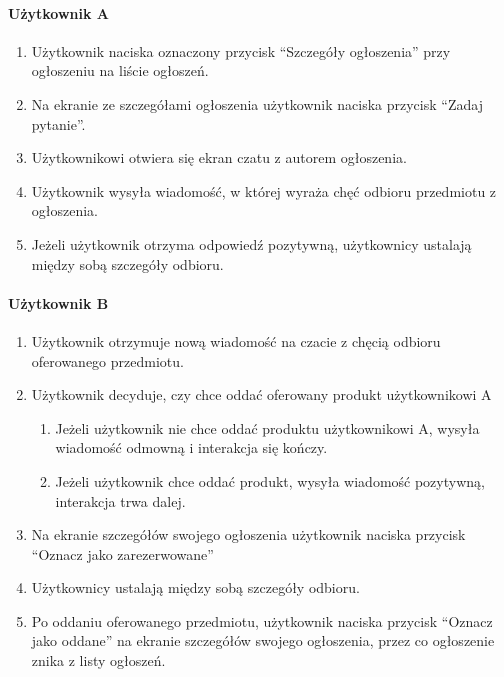 \documentclass[12pt,a4paper,twoside]{article}
\begin{document}
    \paragraph{Użytkownik A}

    \begin{enumerate}
        \item Użytkownik naciska oznaczony przycisk ``Szczegóły ogłoszenia'' przy ogłoszeniu na liście ogłoszeń.
        \item Na ekranie ze szczegółami ogłoszenia użytkownik naciska przycisk ``Zadaj pytanie''.
        \item Użytkownikowi otwiera się ekran czatu z autorem ogłoszenia.
        \item Użytkownik wysyła wiadomość, w której wyraża chęć odbioru przedmiotu z ogłoszenia.
        \item Jeżeli użytkownik otrzyma odpowiedź pozytywną, użytkownicy ustalają między sobą szczegóły odbioru.
    \end{enumerate}

    \paragraph{Użytkownik B}

    \begin{enumerate}
        \item Użytkownik otrzymuje nową wiadomość na czacie z chęcią odbioru oferowanego przedmiotu.
        \item Użytkownik decyduje, czy chce oddać oferowany produkt użytkownikowi A
        \begin{enumerate}
            \item Jeżeli użytkownik nie chce oddać produktu użytkownikowi A, wysyła wiadomość odmowną i interakcja się kończy.
            \item Jeżeli użytkownik chce oddać produkt, wysyła wiadomość pozytywną, interakcja trwa dalej.
        \end{enumerate}
        \item Na ekranie szczegółów swojego ogłoszenia użytkownik naciska przycisk ``Oznacz jako zarezerwowane''
        \item Użytkownicy ustalają między sobą szczegóły odbioru.
        \item Po oddaniu oferowanego przedmiotu, użytkownik naciska przycisk ``Oznacz jako oddane'' na ekranie szczegółów swojego ogłoszenia, przez co ogłoszenie znika z listy ogłoszeń.
    \end{enumerate}
\end{document}
